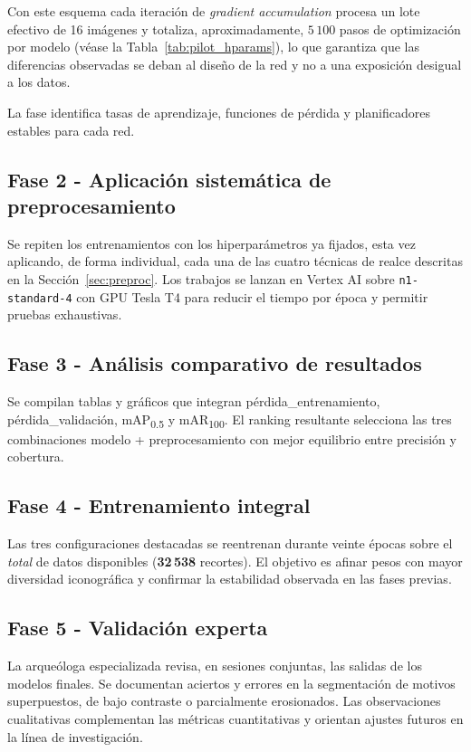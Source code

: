 Con este esquema cada iteración de \textit{gradient accumulation} procesa un lote efectivo de 16 imágenes y totaliza, aproximadamente, \(5\,100\) pasos de optimización por modelo (véase la Tabla~\ref{tab:pilot_hparams}), lo que garantiza que las diferencias observadas se deban al diseño de la red y no a una exposición desigual a los datos.

La fase identifica tasas de aprendizaje, funciones de pérdida y planificadores estables para cada red.

\subsection*{Fase 2 - Aplicación sistemática de preprocesamiento}

Se repiten los entrenamientos con los hiperparámetros ya fijados, esta vez aplicando, de forma individual, cada una de las cuatro técnicas de realce descritas en la Sección~\ref{sec:preproc}.
Los trabajos se lanzan en Vertex AI sobre \texttt{n1-standard-4} con GPU Tesla T4 para reducir el tiempo por época y permitir pruebas exhaustivas.

\subsection*{Fase 3 - Análisis comparativo de resultados}

Se compilan tablas y gráficos que integran pérdida\_entrenamiento, pérdida\_validación, mAP\textsubscript{0.5} y mAR\textsubscript{100}.
El ranking resultante selecciona las tres combinaciones modelo + preprocesamiento con mejor equilibrio entre precisión y cobertura.

\subsection*{Fase 4 - Entrenamiento integral}

Las tres configuraciones destacadas se reentrenan durante veinte épocas sobre el \emph{total} de datos disponibles (\textbf{32\,538} recortes).
El objetivo es afinar pesos con mayor diversidad iconográfica y confirmar la estabilidad observada en las fases previas.

\subsection*{Fase 5 - Validación experta}

La arqueóloga especializada revisa, en sesiones conjuntas, las salidas de los modelos finales.
Se documentan aciertos y errores en la segmentación de motivos superpuestos, de bajo contraste o parcialmente erosionados.
Las observaciones cualitativas complementan las métricas cuantitativas y orientan ajustes futuros en la línea de investigación.

